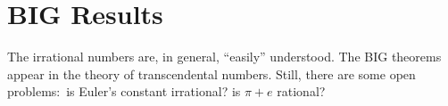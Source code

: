 \documentclass[12pt]{article}
\theoremstyle{definition}
\begin{document}
\section{BIG Results}

The irrational numbers are, in general, ``easily'' understood. The BIG theorems appear in the theory of transcendental numbers. Still, there are some open problems: \,is Euler's constant irrational? is $\pi+e$ rational?
\end{document}
